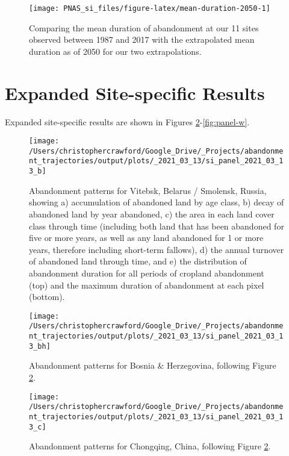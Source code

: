 \documentclass[9pt,twoside,lineno]{pnas-new}
\begin{document}
\begin{figure}
\texttt{[image: PNAS\_si\_files/figure-latex/mean-duration-2050-1]} \caption{Comparing the mean duration of abandonment at our 11 sites observed between 1987 and 2017 with the extrapolated mean duration as of 2050 for our two extrapolations.}\label{fig:mean-duration-2050}
\end{figure}

\hypertarget{expanded-site-specific-results}{%
\section{Expanded Site-specific Results}\label{expanded-site-specific-results}}

Expanded site-specific results are shown in Figures \ref{fig:panel-b}-\ref{fig:panel-w}.













\begin{figure}
\texttt{[image: /Users/christophercrawford/Google\_Drive/\_Projects/abandonment\_trajectories/output/plots/\_2021\_03\_13/si\_panel\_2021\_03\_13\_b]} \caption{Abandonment patterns for Vitebsk, Belarus / Smolensk, Russia, showing a) accumulation of abandoned land by age class, b) decay of abandoned land by year abandoned, c) the area in each land cover class through time (including both land that has been abandoned for five or more years, as well as any land abandoned for 1 or more years, therefore including short-term fallows), d) the annual turnover of abandoned land through time, and e) the distribution of abandonment duration for all periods of cropland abandonment (top) and the maximum duration of abandonment at each pixel (bottom).}\label{fig:panel-b}
\end{figure}

\begin{figure}
\texttt{[image: /Users/christophercrawford/Google\_Drive/\_Projects/abandonment\_trajectories/output/plots/\_2021\_03\_13/si\_panel\_2021\_03\_13\_bh]} \caption{Abandonment patterns for Bosnia \& Herzegovina, following Figure \ref{fig:panel-b}.}\label{fig:panel-bh}
\end{figure}

\begin{figure}
\texttt{[image: /Users/christophercrawford/Google\_Drive/\_Projects/abandonment\_trajectories/output/plots/\_2021\_03\_13/si\_panel\_2021\_03\_13\_c]} \caption{Abandonment patterns for Chongqing, China, following Figure \ref{fig:panel-b}.}\label{fig:panel-c}
\end{figure}
\end{document}
